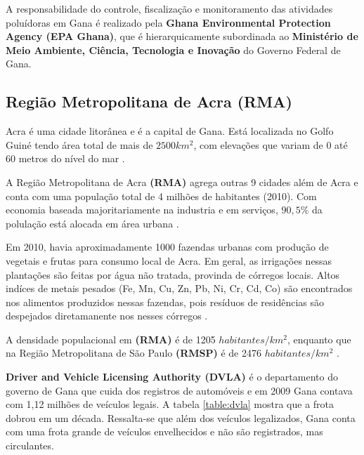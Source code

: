 A responsabilidade do controle, fiscalização e monitoramento das 
atividades poluídoras em Gana é realizado pela 
\textbf{Ghana Environmental Protection Agency (EPA Ghana)}, que é 
hierarquicamente subordinada ao 
\textbf{Ministério de Meio Ambiente, Ciência, Tecnologia e Inovação} do 
Governo Federal de Gana.

\subsection{Região Metropolitana de Acra \textbf{(RMA)}}

Acra é uma cidade litorânea e é a capital de Gana. Está localizada 
no Golfo Guiné tendo área total de mais de  $2500 km^2$, com elevações que 
variam de 0 até 60 metros do nível do mar \citep{ARKU2008}.

A Região Metropolitana de Acra \textbf{(RMA)} agrega outras 9 cidades
além de Acra e conta com uma população total de 4 milhões de habitantes (2010). 
Com economia baseada majoritariamente na industria e em serviços, 
$90,5\%$ da polulação está alocada em área urbana \citep{ghanacensus2013}.

Em 2010, havia aproximadamente 1000 fazendas urbanas com produção de vegetais e
frutas para consumo local de Acra. Em geral, as irrigações nessas plantações
são feitas por água não tratada, provinda de córregos locais. 
Altos indíces de metais pesados (Fe, Mn, Cu, Zn, Pb, Ni, Cr, Cd, Co)
são encontrados nos alimentos produzidos nessas fazendas, pois resíduos de
residências são despejados diretamanente nos nesses córregos \citep{lente2014}.

A densidade populacional em \textbf{(RMA)} é de 1205 $habitantes/km^2$, 
enquanto que na Região Metropolitana de São Paulo \textbf{(RMSP)} é de 
2476 $habitantes/km^2$ \citep{ibge2011}. 

\textbf{Driver and Vehicle Licensing Authority (DVLA)} é o
departamento do governo de Gana que cuida dos registros de automóveis
e em 2009 Gana contava com 1,12 milhões de veículos legais. 
A tabela \ref{table:dvla} mostra que a frota dobrou em um década.
Ressalta-se que além dos veículos legalizados, Gana conta com uma frota grande
de veículos envelhecidos e não são registrados, mas circulantes. 

